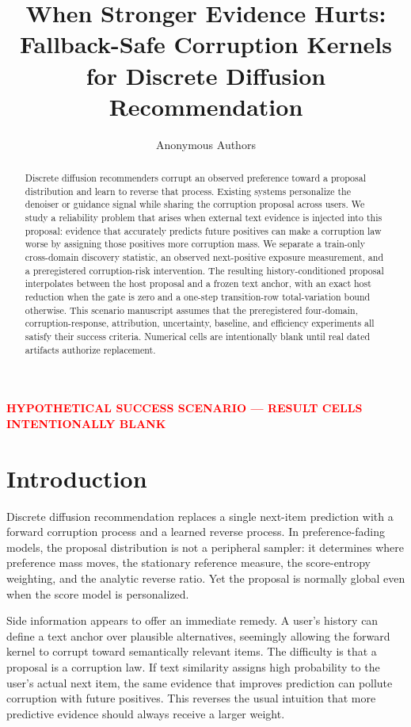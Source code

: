 \documentclass[letterpaper]{article}
\title{When Stronger Evidence Hurts: Fallback-Safe Corruption Kernels for Discrete Diffusion Recommendation}
\author{Anonymous Authors}
\date{}
\newcommand{\scenario}{\textcolor{red}{\textbf{HYPOTHETICAL SUCCESS SCENARIO --- RESULT CELLS INTENTIONALLY BLANK}}}
\begin{document}
\maketitle
\begin{center}\scenario\end{center}

\begin{abstract}
Discrete diffusion recommenders corrupt an observed preference toward a proposal distribution and learn to reverse that process. Existing systems personalize the denoiser or guidance signal while sharing the corruption proposal across users. We study a reliability problem that arises when external text evidence is injected into this proposal: evidence that accurately predicts future positives can make a corruption law worse by assigning those positives more corruption mass. We separate a train-only cross-domain discovery statistic, an observed next-positive exposure measurement, and a preregistered corruption-risk intervention. The resulting history-conditioned proposal interpolates between the host proposal and a frozen text anchor, with an exact host reduction when the gate is zero and a one-step transition-row total-variation bound otherwise. This scenario manuscript assumes that the preregistered four-domain, corruption-response, attribution, uncertainty, baseline, and efficiency experiments all satisfy their success criteria. Numerical cells are intentionally blank until real dated artifacts authorize replacement.
\end{abstract}

\section{Introduction}
Discrete diffusion recommendation replaces a single next-item prediction with a forward corruption process and a learned reverse process. In preference-fading models, the proposal distribution is not a peripheral sampler: it determines where preference mass moves, the stationary reference measure, the score-entropy weighting, and the analytic reverse ratio. Yet the proposal is normally global even when the score model is personalized.

Side information appears to offer an immediate remedy. A user's history can define a text anchor over plausible alternatives, seemingly allowing the forward kernel to corrupt toward semantically relevant items. The difficulty is that a proposal is a corruption law. If text similarity assigns high probability to the user's actual next item, the same evidence that improves prediction can pollute corruption with future positives. This reverses the usual intuition that more predictive evidence should always receive a larger weight.
\end{document}
